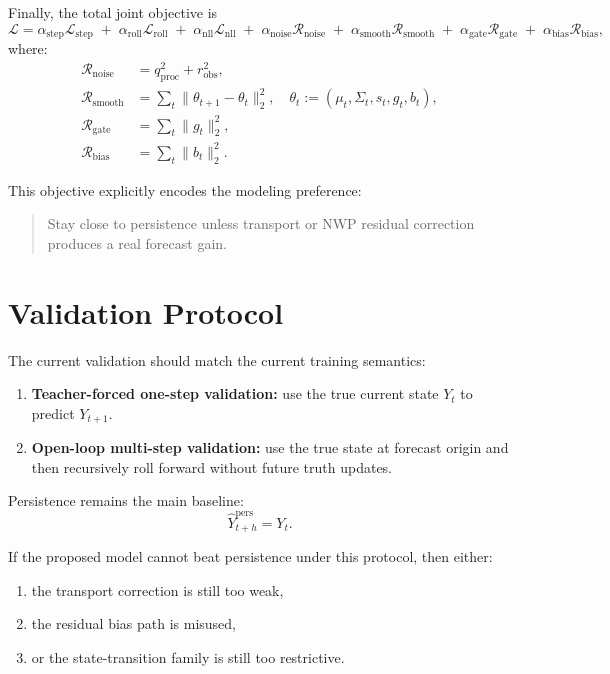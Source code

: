 \documentclass[11pt,a4paper]{article}
\begin{document}
Finally, the total joint objective is
\begin{equation}
\mathcal{L}
=
\alpha_{\mathrm{step}}\mathcal{L}_{\mathrm{step}}
\;+\;
\alpha_{\mathrm{roll}}\mathcal{L}_{\mathrm{roll}}
\;+\;
\alpha_{\mathrm{nll}}\mathcal{L}_{\mathrm{nll}}
\;+\;
\alpha_{\mathrm{noise}}\mathcal{R}_{\mathrm{noise}}
\;+\;
\alpha_{\mathrm{smooth}}\mathcal{R}_{\mathrm{smooth}}
\;+\;
\alpha_{\mathrm{gate}}\mathcal{R}_{\mathrm{gate}}
\;+\;
\alpha_{\mathrm{bias}}\mathcal{R}_{\mathrm{bias}},
\end{equation}
where:
\begin{align}
\mathcal{R}_{\mathrm{noise}} &= q_{\mathrm{proc}}^2 + r_{\mathrm{obs}}^2, \\
\mathcal{R}_{\mathrm{smooth}} &= \sum_t \|\theta_{t+1}-\theta_t\|_2^2,
\quad
\theta_t := (\mu_t, \Sigma_t, s_t, g_t, b_t), \\
\mathcal{R}_{\mathrm{gate}} &= \sum_t \|g_t\|_2^2, \\
\mathcal{R}_{\mathrm{bias}} &= \sum_t \|b_t\|_2^2.
\end{align}

This objective explicitly encodes the modeling preference:
\begin{quote}
Stay close to persistence unless transport or NWP residual correction produces a real forecast gain.
\end{quote}

\section{Validation Protocol}

The current validation should match the current training semantics:
\begin{enumerate}[label=\arabic*.]
  \item \textbf{Teacher-forced one-step validation:} use the true current state $Y_t$ to predict $Y_{t+1}$.
  \item \textbf{Open-loop multi-step validation:} use the true state at forecast origin and then recursively roll forward without future truth updates.
\end{enumerate}

Persistence remains the main baseline:
\begin{equation}
\widehat{Y}_{t+h}^{\mathrm{pers}} = Y_t.
\end{equation}

If the proposed model cannot beat persistence under this protocol, then either:
\begin{enumerate}[label=\arabic*.]
  \item the transport correction is still too weak,
  \item the residual bias path is misused,
  \item or the state-transition family is still too restrictive.
\end{enumerate}
\end{document}
